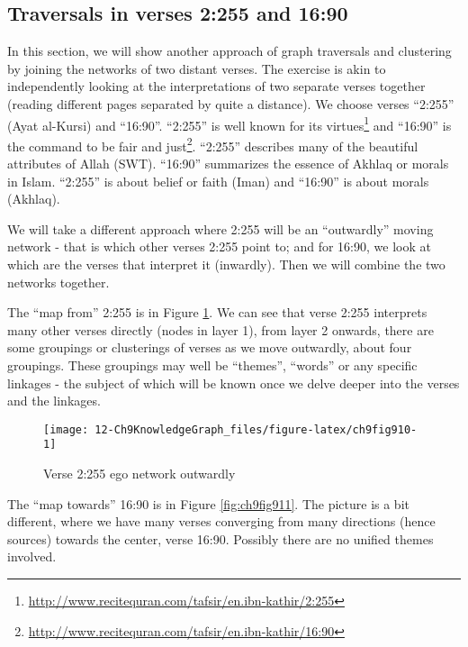 \documentclass[
]{article}
\begin{document}
\hypertarget{traversals-in-verses-2:255-and-16:90}{%
\subsection{Traversals in verses 2:255 and 16:90}\label{traversals-in-verses-2:255-and-16:90}}

In this section, we will show another approach of graph traversals and clustering by joining the networks of two distant verses. The exercise is akin to independently looking at the interpretations of two separate verses together (reading different pages separated by quite a distance). We choose verses ``2:255'' (Ayat al-Kursi) and ``16:90''. ``2:255'' is well known for its virtues\footnote{\url{http://www.recitequran.com/tafsir/en.ibn-kathir/2:255}} and ``16:90'' is the command to be fair and just\footnote{\url{http://www.recitequran.com/tafsir/en.ibn-kathir/16:90}}. ``2:255'' describes many of the beautiful attributes of Allah (SWT). ``16:90'' summarizes the essence of Akhlaq or morals in Islam. ``2:255'' is about belief or faith (Iman) and ``16:90'' is about morals (Akhlaq).

We will take a different approach where 2:255 will be an ``outwardly'' moving network - that is which other verses 2:255 point to; and for 16:90, we look at which are the verses that interpret it (inwardly). Then we will combine the two networks together.

The ``map from'' 2:255 is in Figure \ref{fig:ch9fig910}. We can see that verse 2:255 interprets many other verses directly (nodes in layer 1), from layer 2 onwards, there are some groupings or clusterings of verses as we move outwardly, about four groupings. These groupings may well be ``themes'', ``words'' or any specific linkages - the subject of which will be known once we delve deeper into the verses and the linkages.

\begin{figure}

{\centering \texttt{[image: 12-Ch9KnowledgeGraph\_files/figure-latex/ch9fig910-1]} 

}

\caption{Verse 2:255 ego network outwardly}\label{fig:ch9fig910}
\end{figure}

The ``map towards'' 16:90 is in Figure \ref{fig:ch9fig911}. The picture is a bit different, where we have many verses converging from many directions (hence sources) towards the center, verse 16:90. Possibly there are no unified themes involved.
\end{document}
